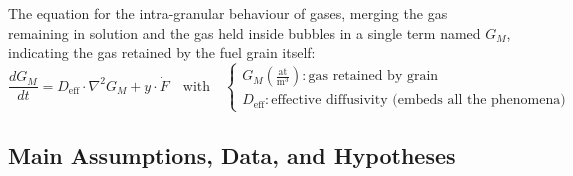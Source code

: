 The equation for the intra-granular behaviour of gases, merging the gas remaining in solution and the gas held inside bubbles in a single term named $G_M$, indicating the gas retained by the fuel grain itself: 
\begin{equation}
    \frac{dG_M}{dt} = D_{\text{eff}} \cdot \nabla^2 G_M + y \cdot \dot{F} \quad \text{with} \quad 
    \begin{cases}
        G_M \left(\frac{\text{at}}{\text{m}^3}\right): \text{gas retained by grain} \\
        D_{\text{eff}}: \text{effective diffusivity (embeds all the phenomena)}
    \end{cases}
\end{equation}

\subsection{Main Assumptions, Data, and Hypotheses}

